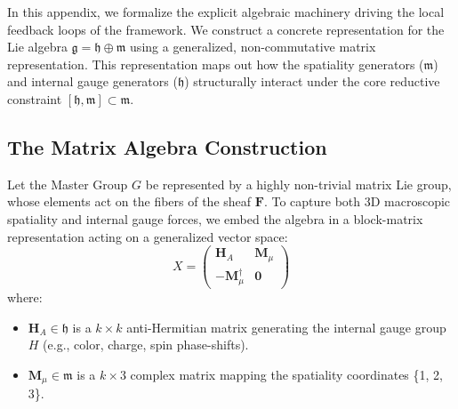 \documentclass[12pt,letterpaper]{article}
\begin{document}
In this appendix, we formalize the explicit algebraic machinery driving the local feedback loops of the framework. We construct a concrete representation for the Lie algebra $\mathfrak{g} = \mathfrak{h} \oplus \mathfrak{m}$ using a generalized, non-commutative matrix representation. This representation maps out how the spatiality generators ($\mathfrak{m}$) and internal gauge generators ($\mathfrak{h}$) structurally interact under the core reductive constraint $[\mathfrak{h}, \mathfrak{m}] \subset \mathfrak{m}$.

\subsection{The Matrix Algebra Construction}
Let the Master Group $G$ be represented by a highly non-trivial matrix Lie group, whose elements act on the fibers of the sheaf $\mathbf{F}$. To capture both 3D macroscopic spatiality and internal gauge forces, we embed the algebra in a block-matrix representation acting on a generalized vector space:
$$X = \begin{pmatrix} \mathbf{H}_{A} & \mathbf{M}_{\mu} \\ -\mathbf{M}_{\mu}^\dagger & \mathbf{0} \end{pmatrix}$$
where:
\begin{itemize}
    \item $\mathbf{H}_{A} \in \mathfrak{h}$ is a $k \times k$ anti-Hermitian matrix generating the internal gauge group $H$ (e.g., color, charge, spin phase-shifts).
    \item $\mathbf{M}_{\mu} \in \mathfrak{m}$ is a $k \times 3$ complex matrix mapping the spatiality coordinates \mu \in \{1, 2, 3\}.
\end{itemize}
\end{document}
